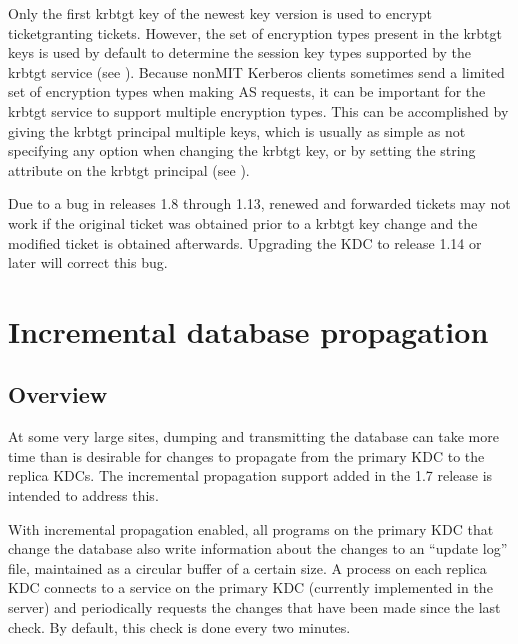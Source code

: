 \documentclass[letterpaper,10pt,english]{sphinxmanual}
\begin{document}
\sphinxAtStartPar
Only the first krbtgt key of the newest key version is used to encrypt
ticket\sphinxhyphen{}granting tickets.  However, the set of encryption types present
in the krbtgt keys is used by default to determine the session key
types supported by the krbtgt service (see
{\hyperref[\detokenize{admin/enctypes:session-key-selection}]{}}).  Because non\sphinxhyphen{}MIT Kerberos clients
sometimes send a limited set of encryption types when making AS
requests, it can be important for the krbtgt service to support
multiple encryption types.  This can be accomplished by giving the
krbtgt principal multiple keys, which is usually as simple as not
specifying any  option when changing the krbtgt key, or by
setting the  string attribute on the krbtgt
principal (see {\hyperref[\detokenize{admin/admin_commands/kadmin_local:set-string}]{}}).

\sphinxAtStartPar
Due to a bug in releases 1.8 through 1.13, renewed and forwarded
tickets may not work if the original ticket was obtained prior to a
krbtgt key change and the modified ticket is obtained afterwards.
Upgrading the KDC to release 1.14 or later will correct this bug.


\section{Incremental database propagation}
\label{\detokenize{admin/database:incremental-database-propagation}}\label{\detokenize{admin/database:incr-db-prop}}

\subsection{Overview}
\label{\detokenize{admin/database:overview}}
\sphinxAtStartPar
At some very large sites, dumping and transmitting the database can
take more time than is desirable for changes to propagate from the
primary KDC to the replica KDCs.  The incremental propagation support
added in the 1.7 release is intended to address this.

\sphinxAtStartPar
With incremental propagation enabled, all programs on the primary KDC
that change the database also write information about the changes to
an “update log” file, maintained as a circular buffer of a certain
size.  A process on each replica KDC connects to a service on the
primary KDC (currently implemented in the {\hyperref[\detokenize{admin/admin_commands/kadmind:kadmind-8}]{}} server) and
periodically requests the changes that have been made since the last
check.  By default, this check is done every two minutes.
\end{document}
